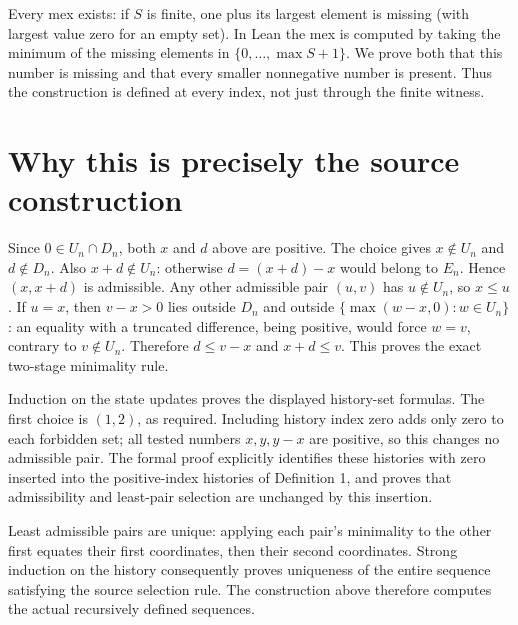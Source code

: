 \documentclass[11pt]{article}
\begin{document}
Every mex exists: if $S$ is finite, one plus its largest element is
missing (with largest value zero for an empty set). In Lean the mex is
computed by taking the minimum of the missing elements in
$\{0,\ldots,\max S+1\}$. We prove both that this number is missing and
that every smaller nonnegative number is present. Thus the construction
is defined at every index, not just through the finite witness.

\section{Why this is precisely the source construction}
Since $0\in U_n\cap D_n$, both $x$ and $d$ above are positive.
The choice gives $x\notin U_n$ and $d\notin D_n$. Also $x+d\notin U_n$:
otherwise $d=(x+d)-x$ would belong to $E_n$. Hence $(x,x+d)$ is admissible.
Any other admissible pair $(u,v)$ has $u\notin U_n$, so $x\le u$.
If $u=x$, then $v-x>0$ lies outside $D_n$ and outside
$\{\max(w-x,0):w\in U_n\}$: an equality with a truncated difference,
being positive, would force $w=v$, contrary to $v\notin U_n$.
Therefore $d\le v-x$ and $x+d\le v$. This proves the exact two-stage
minimality rule.

Induction on the state updates proves the displayed history-set formulas.
The first choice is $(1,2)$, as required. Including history index zero
adds only zero to each forbidden set; all tested numbers $x,y,y-x$ are
positive, so this changes no admissible pair. The formal proof explicitly
identifies these histories with zero inserted into the positive-index
histories of Definition 1, and proves that admissibility and least-pair
selection are unchanged by this insertion.

Least admissible pairs are unique: applying each pair's minimality to the
other first equates their first coordinates, then their second coordinates.
Strong induction on the history consequently proves uniqueness of the
entire sequence satisfying the source selection rule. The construction
above therefore computes the actual recursively defined sequences.
\end{document}
